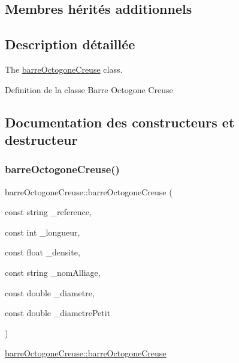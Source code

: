 \subsection*{Membres hérités additionnels}


\subsection{Description détaillée}
The \hyperlink{classbarre_octogone_creuse}{barre\+Octogone\+Creuse} class. 

Definition de la classe Barre Octogone Creuse 

\subsection{Documentation des constructeurs et destructeur}
\mbox{\label{classbarre_octogone_creuse_a87882baf89e869f37c32d1cd27d62f43}} 
\subsubsection{\texorpdfstring{barre\+Octogone\+Creuse()}{barreOctogoneCreuse()}}
{\footnotesize\ttfamily barre\+Octogone\+Creuse\+::barre\+Octogone\+Creuse (\begin{DoxyParamCaption}\item[{const string}]{\+\_\+reference,  }\item[{const int}]{\+\_\+longueur,  }\item[{const float}]{\+\_\+densite,  }\item[{const string}]{\+\_\+nom\+Alliage,  }\item[{const double}]{\+\_\+diametre,  }\item[{const double}]{\+\_\+diametre\+Petit }\end{DoxyParamCaption})}



\hyperlink{classbarre_octogone_creuse_a87882baf89e869f37c32d1cd27d62f43}{barre\+Octogone\+Creuse\+::barre\+Octogone\+Creuse} 


